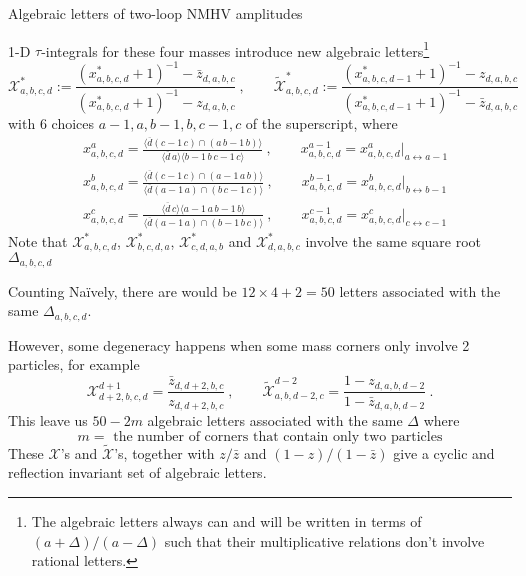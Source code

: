 \documentclass[10pt]{beamer}
\begin{document}
\begin{frame}{Algebraic letters of two-loop NMHV amplitudes}

\footnotesize{
  1-D $\tau$-integrals for these four masses introduce new algebraic letters\footnote{The algebraic letters always can and will be written in terms of $(a+\Delta)/(a-\Delta)$ such that their multiplicative relations don't involve rational letters.}
  \begin{equation*}
    \mathcal{X}_{a,b,c,d}^{\ast}:=\frac{(x^{\ast}_{a,b,c,d}+1)^{-1}-\bar{z}_{d,a,b,c}}{(x^{\ast}_{a,b,c,d}+1)^{-1}-z_{d,a,b,c}}\:, \qquad     
    \widetilde{\mathcal{X}}_{a,b,c,d}^{\ast}:=\frac{(x^{\ast}_{a,b,c,d-1}+1)^{-1}-z
    _{d,a,b,c}}{(x^{\ast}_{a,b,c,d-1}+1)^{-1}-\bar{z}_{d,a,b,c}}
\end{equation*}
with 6 choices $a{-}1,a,b{-}1,b,c{-}1,c$ of the superscript, where
\begin{align*}
    & x^{a}_{a,b,c,d}=\frac{\langle\overline{d} (c{-}1\,c)\cap(a\,b{-}1\,b) \rangle}{\langle \overline{d}\,a\rangle \langle b{-}1\,b\,c{-}1\,c\rangle} \:, \qquad x^{a-1}_{a,b,c,d}= x^{a}_{a,b,c,d}\vert_{a\leftrightarrow a{-}1}\\
    &x_{a,b,c,d}^{b}=\frac{\langle \overline{d} (c{-}1\,c)\cap (a{-}1\,a\,b)\rangle}{\langle \overline{d} (a{-}1\,a)\cap(b\,c{-}1\,c)\rangle} \:, \qquad x^{b-1}_{a,b,c,d}= x^{b}_{a,b,c,d}\vert_{b\leftrightarrow b{-}1} \\
    &x_{a,b,c,d}^{c}=\frac{\langle \overline{d}\,c\rangle\langle a{-}1\,a\,b{-}1\,b\rangle}{\langle \overline{d}(a{-}1\,a)\cap(b{-}1\,b\,c)\rangle} \:, \qquad x^{c-1}_{a,b,c,d}= x^{c}_{a,b,c,d}\vert_{c\leftrightarrow c{-}1}  \nonumber  
\end{align*}
Note that $\mathcal{X}_{a,b,c,d}^{\ast}$, $\mathcal{X}_{b,c,d,a}^{\ast}$, $\mathcal{X}_{c,d,a,b}^{\ast}$ and $\mathcal{X}_{d,a,b,c}^{\ast}$ involve the same square root $\Delta_{a,b,c,d}$

}

\end{frame}

\begin{frame}{Counting}
  Na\"{i}vely, there are would be $12\times 4 +2 =50$ letters associated with the same $\Delta_{a,b,c,d}$. 

  However, some degeneracy happens when some mass corners only involve 2 particles, for example
  \[
    \mathcal{X}_{d+2,b,c,d}^{d+1}=\frac{\bar{z}_{d,d+2,b,c}}{z_{d,d+2,b,c}}\:,\qquad 
    \widetilde{\mathcal{X}}_{a,b,d-2,c}^{d-2}=\frac{1-z_{d,a,b,d-2}}{1-\bar{z}_{d,a,b,d-2}} \:.
  \]
  This leave us $50-2m$ algebraic letters associated with the same $\Delta$ where 
  \[
  m= \text{ the number of corners that contain only two particles}
  \]
  These $\mathcal{X}$'s and $\widetilde{\mathcal{X}}$'s, together with $z/\bar{z}$ and $(1-z)/(1-\bar{z})$ give a cyclic and reflection invariant set of algebraic letters. %
  
\end{frame}
\end{document}
